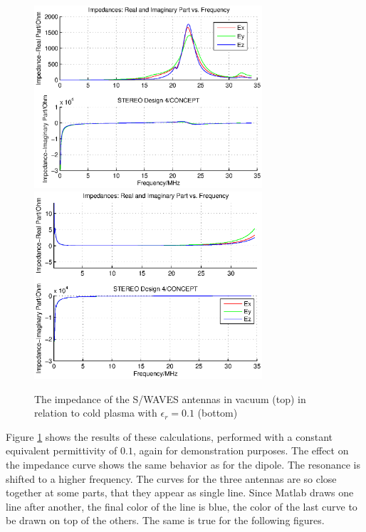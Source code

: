\documentclass[two-column,ras]{agutex}
\begin{document}
\begin{article}
\begin{figure}
 \noindent\includegraphics[width=20pc]{impedance_stereo_vac.eps}
\noindent\includegraphics[width=20pc]{impedance_stereo_pl.eps}
  \caption{The impedance of the S/WAVES antennas in vacuum (top) in relation to cold plasma with $\epsilon_r=0.1$ (bottom)}\label{fig:imp_stereo}
\end{figure}

Figure \ref{fig:imp_stereo} shows the results of these calculations, performed with a constant equivalent permittivity of $0.1$, again for demonstration purposes. The effect on the impedance curve shows the same behavior as for the dipole. The resonance is shifted to a higher frequency. The curves for the three antennas are so close together at some parts, that they appear as single line. Since Matlab draws one line after another, the final color of the line is blue, the color of the last curve to be drawn on top of the others. The same is true for the following figures.\\


\end{article}
\end{document}
